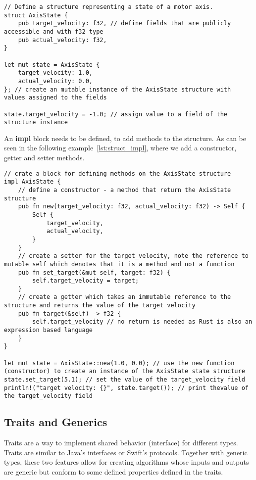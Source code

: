 \begin{lstlisting}[caption={Defining and instantiating a struct in Rust.},label=lst:struct]
// Define a structure representing a state of a motor axis.
struct AxisState {
    pub target_velocity: f32, // define fields that are publicly accessible and with f32 type
    pub actual_velocity: f32,
}

let mut state = AxisState {
    target_velocity: 1.0,
    actual_velocity: 0.0,
}; // create an mutable instance of the AxisState structure with values assigned to the fields

state.target_velocity = -1.0; // assign value to a field of the structure instance
\end{lstlisting}

An \textbf{impl} block needs to be defined, to add methods to the structure.
As can be seen in the following example~\ref{lst:struct_impl}, where we add a constructor, getter and setter methods.
\newpage
\begin{lstlisting}[caption={Adding methods and constructor to a struct in Rust.},label=lst:struct_impl]
// crate a block for defining methods on the AxisState structure
impl AxisState {
    // define a constructor - a method that return the AxisState structure
    pub fn new(target_velocity: f32, actual_velocity: f32) -> Self {
        Self {
            target_velocity,
            actual_velocity,
        }
    }
    // create a setter for the target_velocity, note the reference to mutable self which denotes that it is a method and not a function
    pub fn set_target(&mut self, target: f32) {
        self.target_velocity = target;
    }
    // create a getter which takes an immutable reference to the structure and returns the value of the target velocity
    pub fn target(&self) -> f32 {
        self.target_velocity // no return is needed as Rust is also an expression based language
    }
}

let mut state = AxisState::new(1.0, 0.0); // use the new function (constructor) to create an instance of the AxisState state structure
state.set_target(5.1); // set the value of the target_velocity field
println!("target velocity: {}", state.target()); // print thevalue of the target_velocity field
\end{lstlisting}

\subsection{Traits and Generics}
\label{subsec:traits}
Traits are a way to implement shared behavior (interface) for different types.
Traits are similar to Java's interfaces or Swift's protocols.
Together with generic types, these two features allow for creating algorithms whose inputs and outputs are generic but conform to some defined properties defined in the traits.

